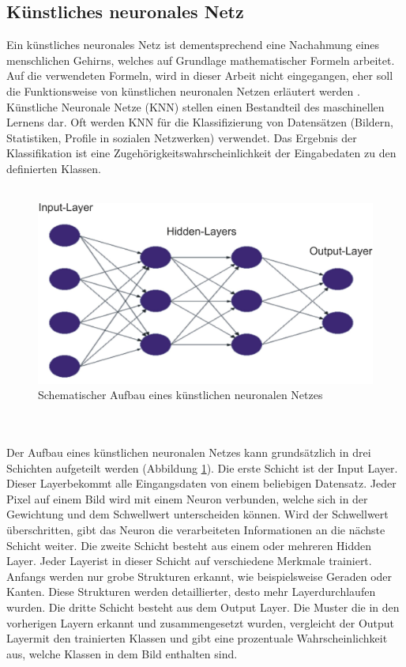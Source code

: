 \documentclass[a4paper,12pt,oneside]{article}
\begin{document}
\subsection{Künstliches neuronales Netz}
Ein künstliches neuronales Netz ist dementsprechend eine Nachahmung eines menschlichen Gehirns, welches auf Grundlage mathematischer Formeln arbeitet. Auf die verwendeten Formeln, wird in dieser Arbeit nicht eingegangen, eher soll die Funktionsweise von künstlichen neuronalen Netzen erläutert werden \cite[247-285]{ertel2013grundkurs}. Künstliche Neuronale Netze (KNN) stellen einen Bestandteil des maschinellen Lernens dar. Oft werden KNN für die Klassifizierung von Datensätzen (Bildern, Statistiken, Profile in sozialen Netzwerken) verwendet. Das Ergebnis der Klassifikation ist eine Zugehörigkeitswahrscheinlichkeit der Eingabedaten zu den definierten Klassen.
\\
\\
\begin{figure}
	[h]
	\centering
	\includegraphics[scale=0.5]{Sources/nnet.png}
		\caption{Schematischer Aufbau eines künstlichen neuronalen Netzes \cite{bistra2018pic} }
	\label{img:KNN}
\end{figure}
\\
\\
Der Aufbau eines künstlichen neuronalen Netzes kann grundsätzlich in drei Schichten aufgeteilt werden (Abbildung \ref{img:KNN}). Die erste Schicht ist der \glqq Input Layer\grqq. Dieser \glqq Layer\grqq bekommt alle Eingangsdaten von einem beliebigen Datensatz. Jeder Pixel auf einem Bild wird mit einem Neuron verbunden, welche sich in der Gewichtung und dem Schwellwert unterscheiden können. Wird der Schwellwert überschritten, gibt das Neuron die verarbeiteten Informationen an die nächste Schicht weiter. Die zweite Schicht besteht aus einem oder mehreren \glqq Hidden Layer\grqq. Jeder \glqq Layer\grqq ist in dieser Schicht auf verschiedene Merkmale trainiert. Anfangs werden nur grobe Strukturen erkannt, wie beispielsweise Geraden oder Kanten. Diese Strukturen werden detaillierter, desto mehr \glqq Layer\grqq durchlaufen wurden. Die dritte Schicht besteht aus dem \glqq Output Layer\grqq. Die Muster die in den vorherigen Layern erkannt und zusammengesetzt wurden, vergleicht der \glqq Output Layer\grqq mit den trainierten Klassen und gibt eine prozentuale Wahrscheinlichkeit aus, welche Klassen in dem Bild enthalten sind.
\end{document}

